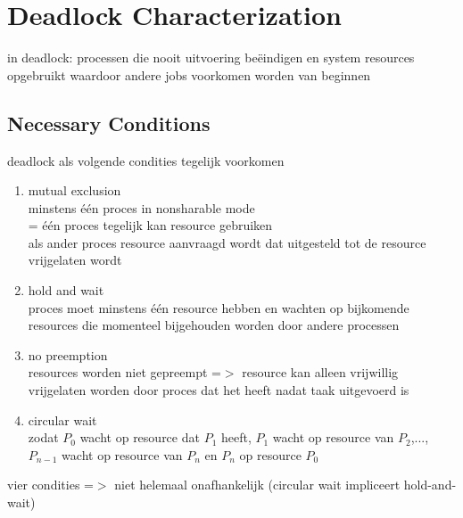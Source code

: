 \documentclass{report}
\begin{document}
\section{Deadlock Characterization}
in deadlock: processen die nooit uitvoering be\"eindigen en system resources opgebruikt waardoor andere jobs voorkomen worden van beginnen
\subsection{Necessary Conditions}
deadlock als volgende condities tegelijk voorkomen
\begin{enumerate}
\item mutual exclusion
\\minstens \'e\'en proces in nonsharable mode
\\= \'e\'en proces tegelijk kan resource gebruiken
\\als ander proces resource aanvraagd wordt dat uitgesteld tot de resource vrijgelaten wordt
\item hold and wait
\\proces moet minstens \'e\'en resource hebben en wachten op bijkomende resources die momenteel bijgehouden worden door andere processen
\item no preemption
\\resources worden niet gepreempt =$>$ resource kan alleen vrijwillig vrijgelaten worden door proces dat het heeft nadat taak uitgevoerd is
\item circular wait
\\zodat $P_{0}$ wacht op resource dat $P_{1}$ heeft, $P_{1}$ wacht op resource van $P_{2}$,..., $P_{n-1}$ wacht op resource van $P_{n}$ en $P_{n}$ op resource $P_{0}$

\end{enumerate} 
vier condities =$>$ niet helemaal onafhankelijk (circular wait impliceert hold-and-wait)
\end{document}
